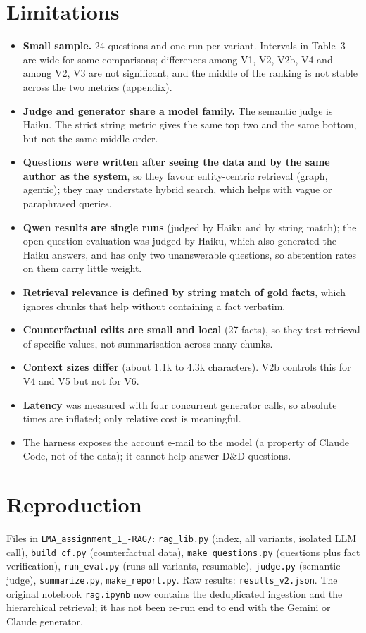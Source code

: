 \documentclass[11pt,a4paper]{article}
\begin{document}
\section{Limitations}
\begin{itemize}
\item \textbf{Small sample.} 24 questions and one run per variant. Intervals in Table~3 are wide for some comparisons; differences among V1, V2, V2b, V4 and among V2, V3 are not significant, and the middle of the ranking is not stable across the two metrics (appendix).
\item \textbf{Judge and generator share a model family.} The semantic judge is Haiku. The strict string metric gives the same top two and the same bottom, but not the same middle order.
\item \textbf{Questions were written after seeing the data and by the same author as the system}, so they favour entity-centric retrieval (graph, agentic); they may understate hybrid search, which helps with vague or paraphrased queries.
\item \textbf{Qwen results are single runs} (judged by Haiku and by string match); the open-question evaluation was judged by Haiku, which also generated the Haiku answers, and has only two unanswerable questions, so abstention rates on them carry little weight.
\item \textbf{Retrieval relevance is defined by string match of gold facts}, which ignores chunks that help without containing a fact verbatim.
\item \textbf{Counterfactual edits are small and local} (27 facts), so they test retrieval of specific values, not summarisation across many chunks.
\item \textbf{Context sizes differ} (about 1.1k to 4.3k characters). V2b controls this for V4 and V5 but not for V6.
\item \textbf{Latency} was measured with four concurrent generator calls, so absolute times are inflated; only relative cost is meaningful.
\item The harness exposes the account e-mail to the model (a property of Claude Code, not of the data); it cannot help answer D\&D questions.
\end{itemize}

\section{Reproduction}
Files in \texttt{LMA\_assignment\_1\_-RAG/}: \texttt{rag\_lib.py} (index, all variants, isolated LLM call), \texttt{build\_cf.py} (counterfactual data), \texttt{make\_questions.py} (questions plus fact verification), \texttt{run\_eval.py} (runs all variants, resumable), \texttt{judge.py} (semantic judge), \texttt{summarize.py}, \texttt{make\_report.py}. Raw results: \texttt{results\_v2.json}. The original notebook \texttt{rag.ipynb} now contains the deduplicated ingestion and the hierarchical retrieval; it has not been re-run end to end with the Gemini or Claude generator.
\end{document}
